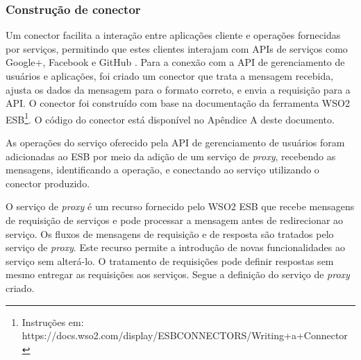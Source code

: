 \subsubsection{Construção de conector}
Um conector facilita a interação entre aplicações cliente e operações fornecidas por serviços, permitindo que estes clientes interajam com APIs de serviços como Google+, Facebook e GitHub \cite{wso2}. Para a conexão com a API de gerenciamento de usuários e aplicações, foi criado um conector que trata a mensagem recebida, ajusta os dados da mensagem para o formato correto, e envia a requisição para a API. O conector foi construído com base na documentação da ferramenta WSO2 ESB\footnote{Instruções em: https://docs.wso2.com/display/ESBCONNECTORS/Writing+a+Connector}. O código do conector está disponível no Apêndice A deste documento.

As operações do serviço oferecido pela API de gerenciamento de usuários foram adicionadas ao ESB por meio da adição de um serviço de \textit{proxy}, recebendo as mensagens, identificando a operação, e conectando ao serviço utilizando o conector produzido. 

O serviço de \textit{proxy} é um recurso fornecido pelo WSO2 ESB que recebe mensagens de requisição de serviços e pode processar a mensagem antes de redirecionar ao serviço. Os fluxos de mensagens de requisição e de resposta são tratados pelo serviço de \textit{proxy}. Este recurso permite a introdução de novas funcionalidades ao serviço sem alterá-lo. O tratamento de requisições pode definir respostas sem mesmo entregar as requisições aos serviços. Segue a definição do serviço de \textit{proxy} criado.



